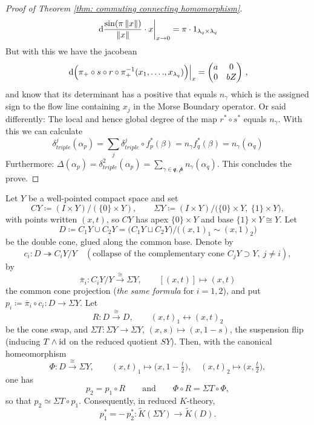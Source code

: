 \begin{proof}[Proof of Theorem \ref{thm: commuting connecting homomorphism}]
		\begin{equation*}
			\left.\mathop{}\!\mathrm{d} \frac{\sin(\pi\left\lVert x\right\rVert)}{\left\lVert x\right\rVert}\cdot x\right|_{x\to 0}=\pi\cdot 1_{\lambda_q\times \lambda_q}
		\end{equation*} But with this we have the jacobean 
		\begin{equation*}
			\left.\mathop{}\!\mathrm{d} \Big( \pi_+\circ s\circ r\circ \pi_+^{-1}(x_1,\dots .,x_{\lambda_q})\Big)\right|_{x}=\begin{pmatrix}
				a&0\\
				0&bZ
			\end{pmatrix}\,,
		\end{equation*} and know that its determinant has a positive that equals $n_{\gamma}$ which is the assigned sign to the flow line containing $x_j$ in the Morse Boundary operator. Or said differently: The local and hence global degree of the map $r^*\circ s^*$ equals $n_\gamma$. With this we can calculate 
		\begin{equation*}
			\delta^j_{triple}(\alpha_p)=\sum_{j}\delta^j_{triple}\circ f_p^*(\beta)=n_{\gamma}f^*_q(\beta)=n_\gamma(\alpha_q)
		\end{equation*}
		Furthermore: $\Delta(\alpha_p)=\delta^2_{triple}(\alpha_p)=\sum_{\gamma \in \mathcal{q,p}} n_\gamma(\alpha_q)$. This concludes the prove. 
	\end{proof}
	\begin{lemma}\label{lem:kTheo-doubleConeFlip}
Let $Y$ be a well-pointed compact space and set
\[
  CY \coloneq (I\times Y)\big/(\{0\}\times Y),
  \qquad
  \Sigma Y \coloneq (I\times Y)\big/\bigl(\{0\}\times Y,\ \{1\}\times Y\bigr),
\]
with points written $(x,t)$, so $CY$ has apex $\{0\}\times Y$ and base $\{1\}\times Y\cong Y$. Let
\[
  D \coloneq C_1Y\cup C_2Y
     = \bigl(C_1Y \sqcup C_2Y\bigr)\big/\bigl((x,1)_1\sim(x,1)_2\bigr)
\]
be the double cone, glued along the common base. Denote by
\[
  c_i\colon D \twoheadrightarrow C_iY\big/Y
  \quad(\text{collapse of the complementary cone }C_jY\supset Y,\ j\neq i),
\]
by
\[
  \overline{\pi}_i\colon C_iY\big/Y \xrightarrow{\ \cong\ } \Sigma Y,
  \qquad [(x,t)]\longmapsto (x,t)
\]
the common cone projection (\emph{the same formula} for $i=1,2$), and put
$p_i \coloneq \overline{\pi}_i\circ c_i\colon D\to\Sigma Y$. Let
\[
  R\colon D\xrightarrow{\ \cong\ } D,\qquad (x,t)_1\longleftrightarrow (x,t)_2
\]
be the cone swap, and $\Sigma T\colon\Sigma Y\to\Sigma Y$, $(x,s)\mapsto(x,1-s)$, the suspension flip
(inducing $T\wedge\operatorname{\mathrm{id}}$ on the reduced quotient $SY$). Then, with the canonical homeomorphism
\[
  \Phi\colon D\xrightarrow{\ \cong\ }\Sigma Y,\qquad
  (x,t)_1\mapsto\bigl(x,1-\tfrac t2\bigr),\quad (x,t)_2\mapsto\bigl(x,\tfrac t2\bigr),
\]
one has
\[
  p_2 = p_1\circ R
  \qquad\text{and}\qquad
  \Phi\circ R = \Sigma T\circ\Phi ,
\]
so that $p_2\simeq \Sigma T\circ p_1$. Consequently, in reduced $K$-theory,
\[
  p_1^{*} = -\,p_2^{*}\colon \tilde K(\Sigma Y)\longrightarrow \tilde K(D).
\]
\end{lemma}

